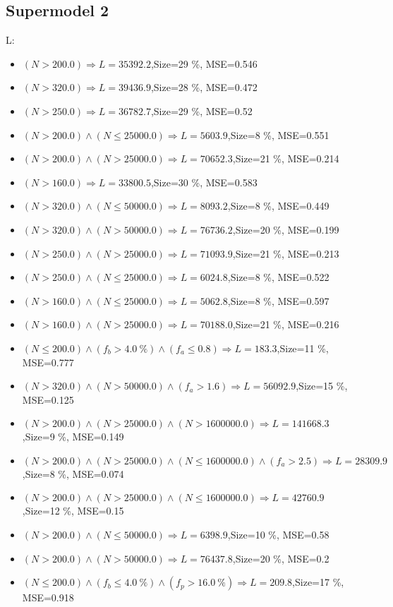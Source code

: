 \documentclass[numbered]{CSL}
\begin{document}
\subsection{Supermodel 2}
L:
\begin{itemize}
\item $(N > 200.0) \Rightarrow L = 35392.2$,\hfill Size=29 \%, MSE=0.546
\item $(N > 320.0) \Rightarrow L = 39436.9$,\hfill Size=28 \%, MSE=0.472
\item $(N > 250.0) \Rightarrow L = 36782.7$,\hfill Size=29 \%, MSE=0.52
\item $(N > 200.0) \land (N \leq 25000.0) \Rightarrow L = 5603.9$,\hfill Size=8 \%, MSE=0.551
\item $(N > 200.0) \land (N > 25000.0) \Rightarrow L = 70652.3$,\hfill Size=21 \%, MSE=0.214
\item $(N > 160.0) \Rightarrow L = 33800.5$,\hfill Size=30 \%, MSE=0.583
\item $(N > 320.0) \land (N \leq 50000.0) \Rightarrow L = 8093.2$,\hfill Size=8 \%, MSE=0.449
\item $(N > 320.0) \land (N > 50000.0) \Rightarrow L = 76736.2$,\hfill Size=20 \%, MSE=0.199
\item $(N > 250.0) \land (N > 25000.0) \Rightarrow L = 71093.9$,\hfill Size=21 \%, MSE=0.213
\item $(N > 250.0) \land (N \leq 25000.0) \Rightarrow L = 6024.8$,\hfill Size=8 \%, MSE=0.522
\item $(N > 160.0) \land (N \leq 25000.0) \Rightarrow L = 5062.8$,\hfill Size=8 \%, MSE=0.597
\item $(N > 160.0) \land (N > 25000.0) \Rightarrow L = 70188.0$,\hfill Size=21 \%, MSE=0.216
\item $(N \leq 200.0) \land (f_b > 4.0~\%) \land (f_a \leq 0.8) \Rightarrow L = 183.3$,\hfill Size=11 \%, MSE=0.777
\item $(N > 320.0) \land (N > 50000.0) \land (f_a > 1.6) \Rightarrow L = 56092.9$,\hfill Size=15 \%, MSE=0.125
\item $(N > 200.0) \land (N > 25000.0) \land (N > 1600000.0) \Rightarrow L = 141668.3$,\hfill Size=9 \%, MSE=0.149
\item $(N > 200.0) \land (N > 25000.0) \land (N \leq 1600000.0) \land (f_a > 2.5) \Rightarrow L = 28309.9$,\hfill Size=8 \%, MSE=0.074
\item $(N > 200.0) \land (N > 25000.0) \land (N \leq 1600000.0) \Rightarrow L = 42760.9$,\hfill Size=12 \%, MSE=0.15
\item $(N > 200.0) \land (N \leq 50000.0) \Rightarrow L = 6398.9$,\hfill Size=10 \%, MSE=0.58
\item $(N > 200.0) \land (N > 50000.0) \Rightarrow L = 76437.8$,\hfill Size=20 \%, MSE=0.2
\item $(N \leq 200.0) \land (f_b \leq 4.0~\%) \land (f_p > 16.0~\%) \Rightarrow L = 209.8$,\hfill Size=17 \%, MSE=0.918
\end{itemize}
\end{document}
